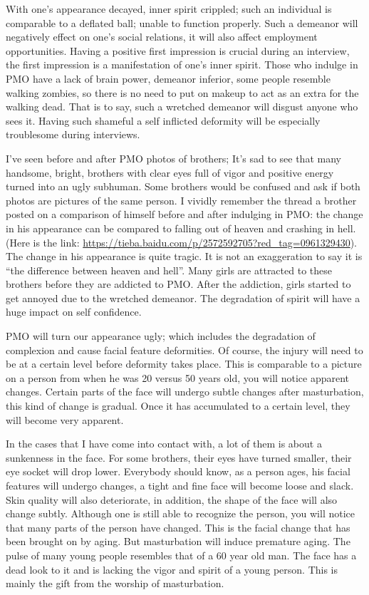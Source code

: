 \documentclass[
]{book}
\begin{document}
With one's appearance decayed, inner spirit crippled; such an individual is comparable to a deflated ball; unable to function properly. Such a demeanor will negatively effect on one's social relations, it will also affect employment opportunities. Having a positive first impression is crucial during an interview, the first impression is a manifestation of one's inner spirit. Those who indulge in PMO have a lack of brain power, demeanor inferior, some people resemble walking zombies, so there is no need to put on makeup to act as an extra for the walking dead. That is to say, such a wretched demeanor will disgust anyone who sees it. Having such shameful a self inflicted deformity will be especially troublesome during interviews.

I've seen before and after PMO photos of brothers; It's sad to see that many handsome, bright, brothers with clear eyes full of vigor and positive energy turned into an ugly subhuman. Some brothers would be confused and ask if both photos are pictures of the same person. I vividly remember the thread a brother posted on a comparison of himself before and after indulging in PMO: the change in his appearance can be compared to falling out of heaven and crashing in hell. (Here is the link: \url{https://tieba.baidu.com/p/2572592705?red_tag=0961329430}). The change in his appearance is quite tragic. It is not an exaggeration to say it is ``the difference between heaven and hell''. Many girls are attracted to these brothers before they are addicted to PMO. After the addiction, girls started to get annoyed due to the wretched demeanor. The degradation of spirit will have a huge impact on self confidence.

PMO will turn our appearance ugly; which includes the degradation of complexion and cause facial feature deformities. Of course, the injury will need to be at a certain level before deformity takes place. This is comparable to a picture on a person from when he was 20 versus 50 years old, you will notice apparent changes. Certain parts of the face will undergo subtle changes after masturbation, this kind of change is gradual. Once it has accumulated to a certain level, they will become very apparent.

In the cases that I have come into contact with, a lot of them is about a sunkenness in the face. For some brothers, their eyes have turned smaller, their eye socket will drop lower. Everybody should know, as a person ages, his facial features will undergo changes, a tight and fine face will become loose and slack. Skin quality will also deteriorate, in addition, the shape of the face will also change subtly. Although one is still able to recognize the person, you will notice that many parts of the person have changed. This is the facial change that has been brought on by aging. But masturbation will induce premature aging. The pulse of many young people resembles that of a 60 year old man. The face has a dead look to it and is lacking the vigor and spirit of a young person. This is mainly the gift from the worship of masturbation.
\end{document}
